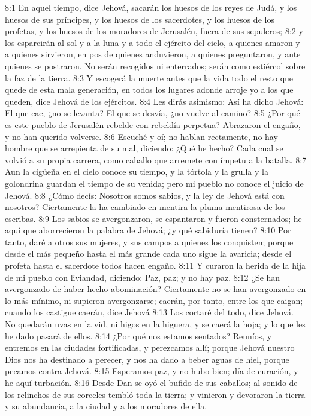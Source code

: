 8:1 En aquel tiempo, dice Jehová, sacarán los huesos de los reyes de Judá, y los huesos de sus príncipes, y los huesos de los sacerdotes, y los huesos de los profetas, y los huesos de los moradores de Jerusalén, fuera de sus sepulcros; 
8:2 y los esparcirán al sol y a la luna y a todo el ejército del cielo, a quienes amaron y a quienes sirvieron, en pos de quienes anduvieron, a quienes preguntaron, y ante quienes se postraron. No serán recogidos ni enterrados; serán como estiércol sobre la faz de la tierra. 
8:3 Y escogerá la muerte antes que la vida todo el resto que quede de esta mala generación, en todos los lugares adonde arroje yo a los que queden, dice Jehová de los ejércitos. 
8:4 Les dirás asimismo: Así ha dicho Jehová: El que cae, ¿no se levanta? El que se desvía, ¿no vuelve al camino? 
8:5 ¿Por qué es este pueblo de Jerusalén rebelde con rebeldía perpetua? Abrazaron el engaño, y no han querido volverse. 
8:6 Escuché y oí; no hablan rectamente, no hay hombre que se arrepienta de su mal, diciendo: ¿Qué he hecho? Cada cual se volvió a su propia carrera, como caballo que arremete con ímpetu a la batalla. 
8:7 Aun la cigüeña en el cielo conoce su tiempo, y la tórtola y la grulla y la golondrina guardan el tiempo de su venida; pero mi pueblo no conoce el juicio de Jehová. 
8:8 ¿Cómo decís: Nosotros somos sabios, y la ley de Jehová está con nosotros? Ciertamente la ha cambiado en mentira la pluma mentirosa de los escribas. 
8:9 Los sabios se avergonzaron, se espantaron y fueron consternados; he aquí que aborrecieron la palabra de Jehová; ¿y qué sabiduría tienen? 
8:10 Por tanto, daré a otros sus mujeres, y sus campos a quienes los conquisten; porque desde el más pequeño hasta el más grande cada uno sigue la avaricia; desde el profeta hasta el sacerdote todos hacen engaño. 
8:11 Y curaron la herida de la hija de mi pueblo con liviandad, diciendo: Paz, paz; y no hay paz. 
8:12 ¿Se han avergonzado de haber hecho abominación? Ciertamente no se han avergonzado en lo más mínimo, ni supieron avergonzarse; caerán, por tanto, entre los que caigan; cuando los castigue caerán, dice Jehová 
8:13 Los cortaré del todo, dice Jehová. No quedarán uvas en la vid, ni higos en la higuera, y se caerá la hoja; y lo que les he dado pasará de ellos. 
8:14 ¿Por qué nos estamos sentados? Reuníos, y entremos en las ciudades fortificadas, y perezcamos allí; porque Jehová nuestro Dios nos ha destinado a perecer, y nos ha dado a beber aguas de hiel, porque pecamos contra Jehová. 
8:15 Esperamos paz, y no hubo bien; día de curación, y he aquí turbación. 
8:16 Desde Dan se oyó el bufido de sus caballos; al sonido de los relinchos de sus corceles tembló toda la tierra; y vinieron y devoraron la tierra y su abundancia, a la ciudad y a los moradores de ella. 
